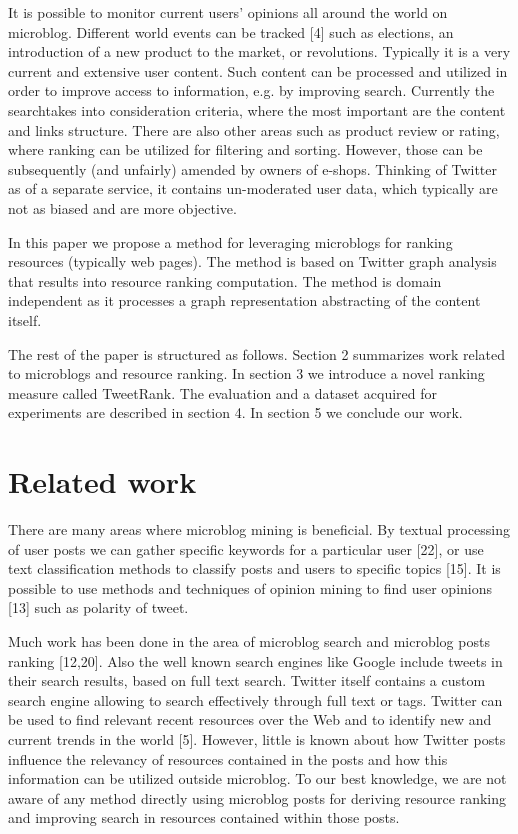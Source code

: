 \documentclass[]{article}
\begin{document}
It is possible to monitor current users’ opinions all around the world on microblog.
Different world events can be tracked [4] such as elections, an introduction
of a new product to the market, or revolutions. Typically it is a very current
and extensive user content. Such content can be processed and utilized in order
to improve access to information, e.g. by improving search. Currently the searchtakes into consideration criteria, where the most important are the content and
links structure. There are also other areas such as product review or rating,
where ranking can be utilized for filtering and sorting. However, those can be
subsequently (and unfairly) amended by owners of e-shops. Thinking of Twitter
as of a separate service, it contains un-moderated user data, which typically are
not as biased and are more objective.

In this paper we propose a method for leveraging microblogs for ranking
resources (typically web pages). The method is based on Twitter graph analysis
that results into resource ranking computation. The method is domain
independent as it processes a graph representation abstracting of the content
itself.

The rest of the paper is structured as follows. Section 2 summarizes work
related to microblogs and resource ranking. In section 3 we introduce a novel
ranking measure called TweetRank. The evaluation and a dataset acquired for
experiments are described in section 4. In section 5 we conclude our work.

\section{Related work}
There are many areas where microblog mining is beneficial. By textual processing
of user posts we can gather specific keywords for a particular user [22], or use
text classification methods to classify posts and users to specific topics [15]. It is
possible to use methods and techniques of opinion mining to find user opinions
[13] such as polarity of tweet.

Much work has been done in the area of microblog search and microblog
posts ranking [12,20]. Also the well known search engines like Google include
tweets in their search results, based on full text search. Twitter itself contains
a custom search engine allowing to search effectively through full text or tags.
Twitter can be used to find relevant recent resources over the Web and to identify
new and current trends in the world [5]. However, little is known about
how Twitter posts influence the relevancy of resources contained in the posts
and how this information can be utilized outside microblog. To our best knowledge,
we are not aware of any method directly using microblog posts for deriving
resource ranking and improving search in resources contained within those
posts.
\end{document}
